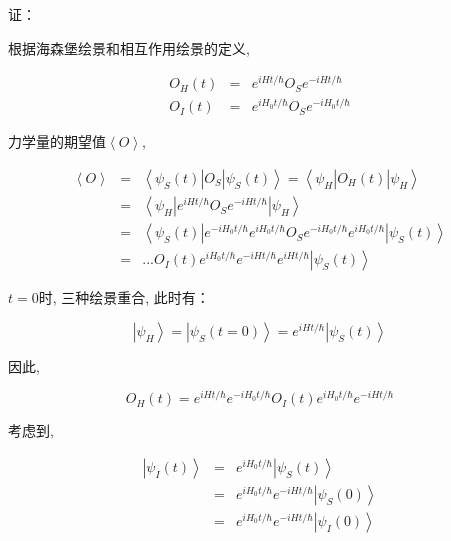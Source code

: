 证：

根据海森堡绘景和相互作用绘景的定义,

\begin{eqnarray*}
  O_H(t) &=& e^{iHt/ \hbar}O_S e^{-iHt/ \hbar} \\
  O_I(t) &=& e^{iH_0t/ \hbar}O_S e^{-iH_0t/ \hbar}
\end{eqnarray*}

力学量的期望值$\left\langle O \right\rangle $,

\begin{eqnarray*}
  \left\langle O \right\rangle &=& \left\langle \psi_S(t)\right| O_S \left| \psi_S(t) \right\rangle = \left\langle \psi_H \right| O_H(t) \left| \psi_H \right\rangle\\
  {} &=& \left\langle \psi_H \right|  e^{iHt/ \hbar} O_S e^{-iHt/ \hbar}  \left| \psi_H
  \right\rangle \\
  {} &=& \left\langle \psi_S(t)\right|  e^{-iH_0t/ \hbar} e^{iH_0t/ \hbar} O_S e^{-iH_0t/ \hbar} e^{iH_0t/ \hbar} \left| \psi_S(t)
  \right\rangle \\
  {} &=& ... O_I(t) e^{i H_0 t/ \hbar} e^{-i Ht/ \hbar} e^{i Ht/
  \hbar} \left| \psi_S(t) \right\rangle
\end{eqnarray*}


$t=0$时, 三种绘景重合, 此时有：

\begin{equation*}
\left| \psi_H \right\rangle = \left|\psi_S(t=0) \right\rangle =
e^{iHt/ \hbar} \left| \psi_S(t) \right\rangle
\end{equation*}

因此,

\begin{equation*}
    O_H (t) = e^{iHt/\hbar} e^{-iH_0t/\hbar} O_I(t) e^{iH_0t/\hbar} e^{-iHt/\hbar}
\end{equation*}

考虑到,

\begin{eqnarray*}
\left| \psi_I(t) \right\rangle &=& e^{i H_0 t/ \hbar} \left|
\psi_S(t)\right\rangle \\
  {} &=& e^{i H_0 t/ \hbar} e^{-iHt/\hbar} \left|
\psi_S(0) \right\rangle \\
  {} &=& e^{i H_0 t/ \hbar} e^{-iHt/\hbar} \left|
\psi_I(0) \right\rangle
\end{eqnarray*}

